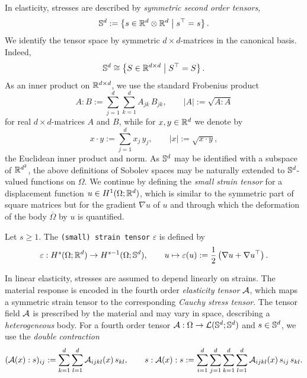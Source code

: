 In elasticity, stresses are described by {\em symmetric second order tensors},
\begin{equation*}
	\S^d:= \left\{s\in\R^d\otimes\R^d\;\middle|\; s^\top = s\right\}.
\end{equation*}
We identify the tensor space by symmetric $d\times d$-matrices in the canonical basis. Indeed,
\begin{equation*}
	\S^d\cong \left\{ S\in \R^{d\times d}\;\middle|\; S^\top = S\right\}.
\end{equation*}
As an inner product on $\R^{d\times d}$, we use the standard Frobenius product
\begin{equation*}
	A:B:= \sum_{j = 1}^d\sum_{k = 1}^d A_{jk}\, B_{jk},\qquad |A|:= \sqrt{A:A}
\end{equation*}
for real $d\times d$-matrices $A$ and $B$, while for $x,y\in \R^d$ we denote by
\begin{equation*}
	x\cdot y:= \sum_{j = 1}^d x_j\, y_j,\qquad |x|:= \sqrt{x\cdot y},
\end{equation*}
the Euclidean inner product and norm. As $\S^d$ may be identified with a subspace of $\R^{d^2}$, the above definitions of Sobolev spaces may be naturally extended to $\S^d$-valued functions on $\Omega$. We continue by defining the {\em small strain tensor} for a displacement function $u\in H^1(\Omega;\R^d)$, which is similar to the symmetric part of square matrices but for the gradient $\nabla u$ of $u$ and through which the deformation of the body $\overline{\Omega}$ by $u$ is quantified.

\begin{definition}\label{def:smallstraintensor}
	Let $s\ge 1$. The {\tt (small) strain tensor} $\varepsilon$ is defined by
	\begin{equation*}
		\varepsilon:H^s(\Omega;\R^d)\to H^{s-1}(\Omega;\S^d),\qquad u\mapsto \varepsilon(u):= \frac{1}{2}\left(\nabla u + \nabla u^\top\right).
	\end{equation*}
\end{definition}

In linear elasticity, stresses are assumed to depend linearly on strains. The material response is encoded in the fourth order {\em elasticity tensor} $\cA$, which maps a symmetric strain tensor to the corresponding {\em Cauchy stress tensor}. The tensor field $\cA$ is prescribed by the material and may vary in space, describing a {\em heterogeneous} body. For a fourth order tensor $\cA:\Omega\to\cL(\S^d;\S^d)$ and $s\in \S^d$, we use the {\em double contraction}
\begin{equation*}
	(\cA(x):s)_{ij}:=\sum_{k = 1}^d \sum_{l = 1}^d \cA_{ijkl}(x)\,s_{kl},
	\qquad
	s:\cA(x):s:=\sum_{i = 1}^d \sum_{j = 1}^d \sum_{k = 1}^d \sum_{l = 1}^d\cA_{ijkl}(x)\,s_{ij}\,s_{kl}.
\end{equation*}

